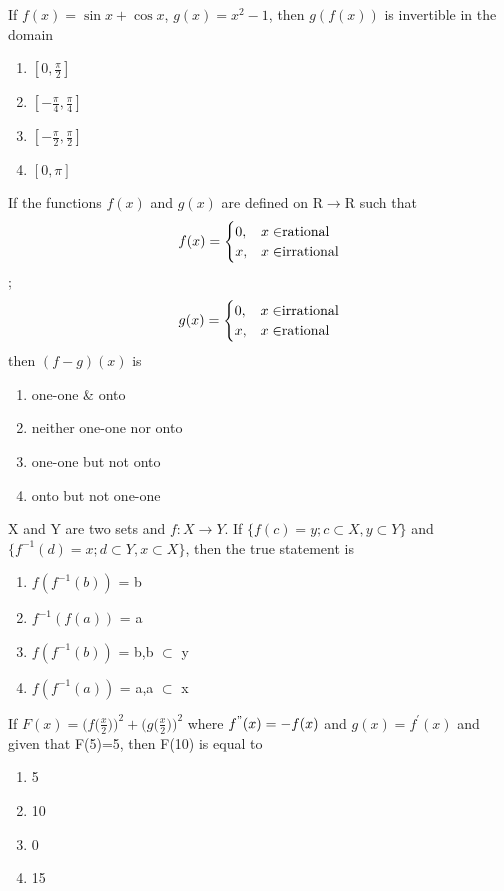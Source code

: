 \item If $f(x)=\sin x+\cos x$, $g(x)=x^{2}-1$, then $g(f(x))$ is invertible in the domain
\begin{enumerate}
\item $[0,\frac{\pi}{2}]$
\item $[-\frac{\pi}{4},\frac{\pi}{4}]$
\item $[-\frac{\pi}{2},\frac{\pi}{2}]$
\item $[0,\pi]$
\end{enumerate}

\item If the functions $f(x)$ and $g(x)$ are defined on R$\rightarrow$R such that \[f(x)=\begin{cases} 
       0, & x \in $rational$\\
       x, & x \in $irrational$\\
   \end{cases}\]; \[g(x)=\begin{cases} 
       0, & x \in $irrational$\\
       x, & x \in $rational$\\
   \end{cases}\] then $(f-g)(x)$ is
\begin{enumerate}
\item one-one \& onto
\item neither one-one nor onto
\item one-one but not onto
\item onto but not one-one
\end{enumerate}

\item X and Y are two sets and $f: X \rightarrow Y$. If $\{ f(c)=y; c \subset X, y \subset Y \}$ and  
$\{ f^{-1}(d) = x; d \subset Y, x \subset X \}$, then the true statement is
\begin{enumerate}
\item $f(f^{-1}(b))$ = b
\item $f^{-1}(f(a))$ = a
\item $f(f^{-1}(b))$ = b,b $\subset$ y
\item $f(f^{-1}(a))$ = a,a $\subset$ x
\end{enumerate} 

\item If $F(x) = \Big(f\Big(\frac{x}{2}\Big)\Big)^2+\Big(g\Big(\frac{x}{2}\Big)\Big)^2$ where $f^{"}(x)= -f(x)$ and $g(x)=f^{'}(x)$ and given that F(5)=5, then F(10) is equal to
\begin{enumerate}
\item 5
\item 10
\item 0
\item 15
\end{enumerate}

